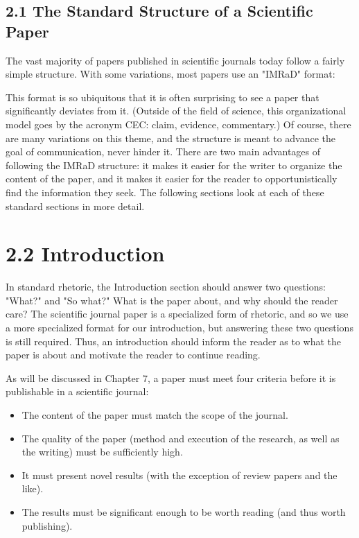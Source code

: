 \subsection*{2.1 The Standard Structure of a Scientific Paper}
The vast majority of papers published in scientific journals today follow a fairly simple structure. With some variations, most papers use an "IMRaD" format:

This format is so ubiquitous that it is often surprising to see a paper that significantly deviates from it. (Outside of the field of science, this organizational model goes by the acronym CEC: claim, evidence, commentary.) Of course, there are many variations on this theme, and the structure is meant to advance the goal of communication, never hinder it. There are two main advantages of following the IMRaD structure: it makes it easier for the writer to organize the content of the paper, and it makes it easier for the reader to opportunistically find the information they seek. The following sections look at each of these standard sections in more detail.

\section*{2.2 Introduction }
In standard rhetoric, the Introduction section should answer two questions: "What?" and "So what?" What is the paper about, and why should the reader care? The scientific journal paper is a specialized form of rhetoric, and so we use a more specialized format for our introduction, but answering these two questions is still required. Thus, an introduction should inform the reader as to what the paper is about and motivate the reader to continue reading.

As will be discussed in Chapter 7, a paper must meet four criteria before it is publishable in a scientific journal:

\begin{itemize}
  \item The content of the paper must match the scope of the journal.
  \item The quality of the paper (method and execution of the research, as well as the writing) must be sufficiently high.
  \item It must present novel results (with the exception of review papers and the like).
  \item The results must be significant enough to be worth reading (and thus worth publishing).
\end{itemize}

